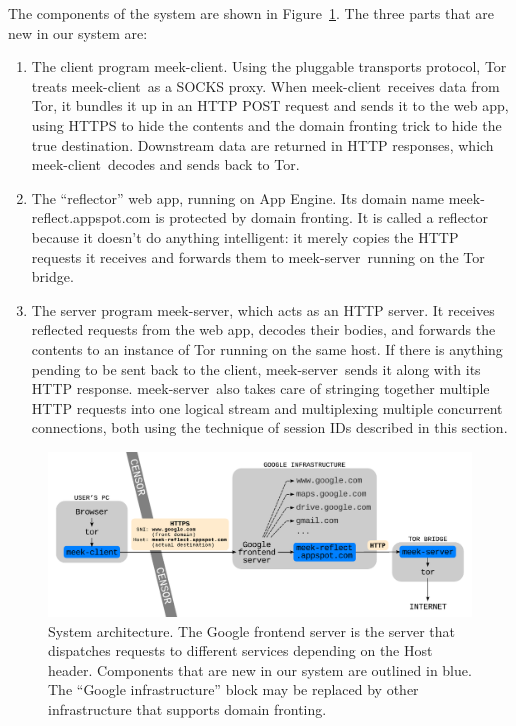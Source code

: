 \documentclass[conference]{IEEEtran}
\def\meekclient{\mbox{meek-client}}
\def\meekserver{\mbox{meek-server}}
\begin{document}
The components of the system are shown in Figure~\ref{fig:architecture}.
The three parts that are new in our system are:
\begin{enumerate}
\item The client program \meekclient.
Using the pluggable transports protocol, Tor treats \meekclient\ as a SOCKS proxy.
When \meekclient\ receives data from Tor, it bundles it up in an HTTP POST
request and sends it to the web app,
using HTTPS to hide the contents and the domain fronting trick to hide the true destination.
Downstream data are returned in HTTP responses, which \meekclient\ decodes and sends back to Tor.
\item The ``reflector'' web app, running on App Engine.
Its domain name \mbox{meek-reflect.appspot.com} is protected by domain fronting.
It is called a reflector because it doesn't do anything intelligent:
it merely copies the HTTP requests it receives and forwards them
to \meekserver\ running on the Tor bridge.
\item The server program \meekserver, which acts as an HTTP server.
It receives reflected requests from the web app, decodes their bodies,
and forwards the contents to an instance of Tor running on the same host.
If there is anything pending to be sent back to the client,
\meekserver\ sends it along with its HTTP response.
\meekserver\ also takes care of stringing together multiple HTTP requests
into one logical stream and multiplexing multiple concurrent connections,
both using the technique of session IDs described in this section.
\end{enumerate}

\begin{figure}
\centering
\includegraphics[width=\linewidth]{architecture}
\caption{
System architecture.
The Google frontend server is the server that dispatches requests to different services depending on the Host header.
Components that are new in our system are outlined in blue.
The ``Google infrastructure'' block may be replaced by other infrastructure that supports domain fronting.
}
\label{fig:architecture}
\end{figure}
\end{document}
